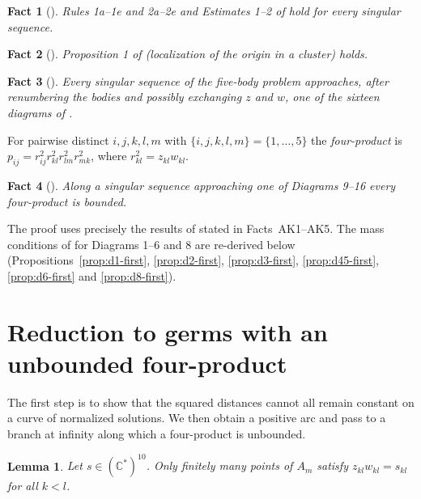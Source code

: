 \documentclass[11pt]{amsart}
\newtheorem{lemma}[theorem]{Lemma}
\newtheorem{fact}{Fact}
\theoremstyle{definition}
\theoremstyle{remark}
\newcommand{\C}{\mathbb{C}}
\begin{document}
\begin{fact}[{\cite[\S3]{AK}}]\label{fact:rules}
Rules 1a--1e and 2a--2e and Estimates 1--2 of \cite[\S3]{AK} hold for every singular sequence.
\end{fact}

\begin{fact}[{\cite[Prop.~1]{AK}}]\label{fact:prop1}
Proposition 1 of \cite{AK} (localization of the origin in a cluster) holds.
\end{fact}

\begin{fact}[{\cite[\S7]{AK}}]\label{fact:fig11}
Every singular sequence of the five-body problem approaches, after renumbering the bodies and
possibly exchanging $z$ and $w$, one of the sixteen diagrams of \cite[Fig.~11]{AK}.
\end{fact}

For pairwise distinct $i,j,k,l,m$ with $\{i,j,k,l,m\}=\{1,\dots,5\}$ the \emph{four-product} is
$p_{ij}=r_{ij}^2r_{kl}^2r_{lm}^2r_{mk}^2$, where $r_{kl}^2=z_{kl}w_{kl}$.

\begin{fact}[{\cite[Prop.~8]{AK}}]\label{fact:prop8}
Along a singular sequence approaching one of Diagrams 9--16 every four-product is bounded.
\end{fact}

The proof uses precisely the results of \cite{AK} stated in Facts~AK1--AK5.  The mass conditions of
\cite[\S8]{AK} for Diagrams 1--6 and 8 are re-derived below
(Propositions~\ref{prop:d1-first}, \ref{prop:d2-first}, \ref{prop:d3-first},
\ref{prop:d45-first}, \ref{prop:d6-first} and \ref{prop:d8-first}).


\section{Reduction to germs with an unbounded four-product}\label{sec:reduction}

The first step is to show that the squared distances cannot all remain constant on a
curve of normalized solutions.  We then obtain a positive arc and pass to a branch at
infinity along which a four-product is unbounded.

\begin{lemma}\label{lem:distances}
Let $s\in(\C^*)^{10}$.  Only finitely many points of $A_m$ satisfy $z_{kl}w_{kl}=s_{kl}$ for all
$k<l$.
\end{lemma}
\end{document}
